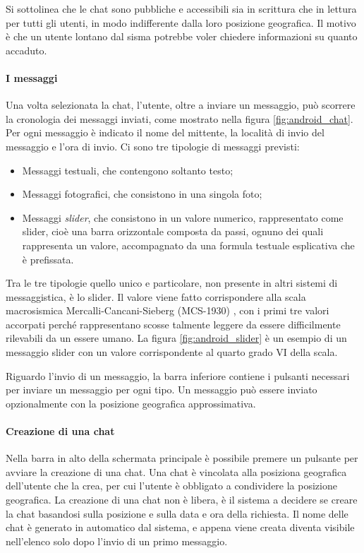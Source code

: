 Si sottolinea che le chat sono pubbliche e accessibili sia in scrittura che in lettura per tutti gli utenti, in modo indifferente dalla loro posizione geografica. Il motivo è che un utente lontano dal sisma potrebbe voler chiedere informazioni su quanto accaduto.

\paragraph{I messaggi} Una volta selezionata la chat, l'utente, oltre a inviare un messaggio, può scorrere la cronologia dei messaggi inviati, come mostrato nella figura \ref{fig:android_chat}. Per ogni messaggio è indicato il nome del mittente, la località di invio del messaggio e l'ora di invio. Ci sono tre tipologie di messaggi previsti:

\begin{itemize}
\item Messaggi testuali, che contengono soltanto testo;
\item Messaggi fotografici, che consistono in una singola foto;
\item Messaggi \textit{slider}, che consistono in un valore numerico, rappresentato come slider, cioè una barra orizzontale composta da passi, ognuno dei quali rappresenta un valore, accompagnato da una formula testuale esplicativa che è prefissata.
\end{itemize}

Tra le tre tipologie quello unico e particolare, non presente in altri sistemi di messaggistica, è lo slider. Il valore viene fatto corrispondere alla scala macrosismica Mercalli-Cancani-Sieberg (MCS-1930) \cite{mcs}, con i primi tre valori accorpati perché rappresentano scosse talmente leggere da essere difficilmente rilevabili da un essere umano. La figura \ref{fig:android_slider} è un esempio di un messaggio slider con un valore corrispondente al quarto grado VI della scala.

Riguardo l'invio di un messaggio, la barra inferiore contiene i pulsanti necessari per inviare un messaggio per ogni tipo. Un messaggio può essere inviato opzionalmente con la posizione geografica approssimativa.

\paragraph{Creazione di una chat} Nella barra in alto della schermata principale è possibile premere un pulsante per avviare la creazione di una chat. Una chat è vincolata alla posiziona geografica dell'utente che la crea, per cui l'utente è obbligato a condividere la posizione geografica. La creazione di una chat non è libera, è il sistema a decidere se creare la chat basandosi sulla posizione e sulla data e ora della richiesta. Il nome delle chat è generato in automatico dal sistema, e appena viene creata diventa visibile nell'elenco solo dopo l'invio di un primo messaggio.

